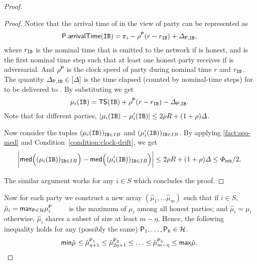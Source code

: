 \begin{proof}
\begin{proof}
        Notice that the arrival time of  in the view of party \party can be represented as
        \[ \mathsf{P}.\mathsf{arrivalTime}(\mathtt{IB}) = \mathtt{r}_i - \rho^\mathsf{P}(r - r_\mathtt{IB}) + \varDelta_{\mathsf{P}, \mathtt{IB}}, \]
        where $r_\mathtt{IB}$ is the nominal time that  is emitted to the network if  is honest, and is the first nominal time step such that at least one honest party receives  if  is adversarial.
        And $\rho^\mathsf{P}$ is the clock speed of party \party during nominal time $r$ and $r_\mathtt{IB}$.
        The quantity $\varDelta_{\mathsf{P}, \mathtt{IB}} \in [\varDelta]$ is the time elapsed (counted by nominal-time steps) for  to be delivered to \party.
        By substituting we get
        \begin{equation*}
            \mu_i(\mathtt{IB}) = \mathsf{TS}(\mathtt{IB}) + \rho^\mathsf{P}(r - r_\mathtt{IB}) - \varDelta_{\mathsf{P}, \mathtt{IB}}.
        \end{equation*}
        Note that for different parties, $|\mu_i(\mathtt{IB}) - \mu'_i(\mathtt{IB})| \le 2 \rho R + (1 + \rho) \varDelta$.

        Now consider the tuples $(\mu_i(\mathtt{IB}))_{\mathtt{IB} \in IB}$ and $(\mu'_i(\mathtt{IB}))_{\mathtt{IB} \in IB}$.
        By applying \cref{fact:seq-med} and Condition~\eqref{condition:clock-drift}, we get
        \[ \bigg| \mathsf{med} \Big((\mu_i(\mathtt{IB}))_{\mathtt{IB} \in IB} \Big) - \mathsf{med} \Big((\mu'_i(\mathtt{IB}))_{\mathtt{IB} \in IB} \Big) \bigg| \le 2 \rho R + (1 +  \rho) \varDelta \le \varPhi_{\mathsf{init}} / 2. \]

        The similar argument works for any $i \in S$ which concludes the proof.
    \end{proof}

    Now for each party \party we construct a new array $(\hat{\mu}_1, \ldots \hat{\mu}_m)$ such that if $i \in S$, $\hat{\mu}_i = \mathsf{max}_{\mathsf{P} \in \mathcal{H}} \mu^\mathsf{P}_i \qquad$ is the maximum of $\mu_i$ among all honest parties; and $\hat{\mu}_i = \mu_i$ otherwise.
    $\hat{\mu}_i$ shares a subset of size at least $m - \eta$.
    Hence, the following inequality holds for any (possibly the same) $\mathsf{P}_1, \ldots, \mathsf{P}_k \in \mathcal{H}$.
    \[ \mathsf{min} \hat{\mu} \le \hat{\mu}^{\mathsf{P}_1}_{\eta + 1} \le \hat{\mu}^{\mathsf{P}_2}_{2\eta + 1} \le \ldots \le \hat{\mu}^{\mathsf{P}_k}_{m - \eta} \le \mathsf{max} \hat{\mu}. \]


\end{proof}
